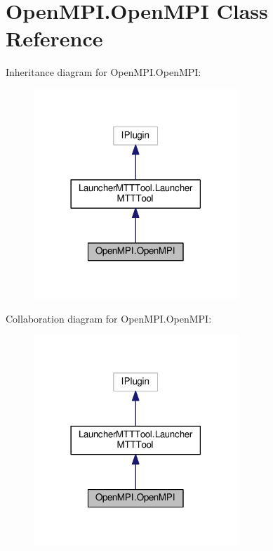 \hypertarget{classOpenMPI_1_1OpenMPI}{\section{Open\-M\-P\-I.\-Open\-M\-P\-I Class Reference}
\label{classOpenMPI_1_1OpenMPI}
}


Inheritance diagram for Open\-M\-P\-I.\-Open\-M\-P\-I\-:
\nopagebreak
\begin{figure}[H]
\begin{center}
\leavevmode
\includegraphics[width=218pt]{classOpenMPI_1_1OpenMPI__inherit__graph}
\end{center}
\end{figure}


Collaboration diagram for Open\-M\-P\-I.\-Open\-M\-P\-I\-:
\nopagebreak
\begin{figure}[H]
\begin{center}
\leavevmode
\includegraphics[width=218pt]{classOpenMPI_1_1OpenMPI__coll__graph}
\end{center}
\end{figure}
